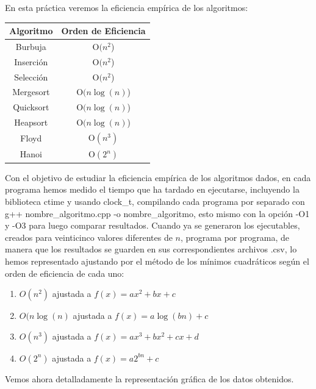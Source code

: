 En esta práctica veremos la eficiencia empírica de los algoritmos:

\begin{center}
\begin{tabular}{| c | c |}
\hline
Algoritmo & Orden de Eficiencia \\ \hline
Burbuja & O$(n^2$) \\ \hline
Inserción & O$(n^2$) \\ \hline 
Selección & O$(n^2$) \\ \hline 
Mergesort & O$(n\log(n)$) \\ \hline 
Quicksort & O$(n\log(n)$) \\ \hline 
Heapsort & O$(n\log(n)$) \\ \hline
Floyd & O$(n^3)$ \\ \hline 
Hanoi & O$(2^n)$ \\ \hline 
\hline
\end{tabular}
\end{center}
Con el objetivo de estudiar la eficiencia empírica de los algoritmos dados, en cada programa hemos medido el tiempo que ha tardado en ejecutarse, incluyendo la biblioteca ctime y usando clock\_t, compilando cada programa por separado con g++ nombre\_algoritmo.cpp -o nombre\_algoritmo, esto mismo con la opción -O1 y -O3 para luego comparar resultados. 
Cuando ya se generaron los ejecutables, creados para veinticinco valores diferentes de $n$, programa por programa, de manera que los resultados se guarden en sus correspondientes archivos .csv, lo hemos representado ajustando por el método de los mínimos cuadráticos según el orden de eficiencia de cada uno:
\begin{enumerate}
\item $O(n^2)$ ajustada a $f(x)=ax^2+bx+c$
\item $O(n\log(n)$ ajustada a $f(x)=a\log(bn)+c$
\item $O(n^3)$ ajustada a $f(x)=ax^3+bx^2+cx+d$
\item $O(2^n)$ ajustada a $f(x)=a2^{bn}+c$
\end{enumerate}

Vemos ahora detalladamente la representación gráfica de los datos obtenidos.












